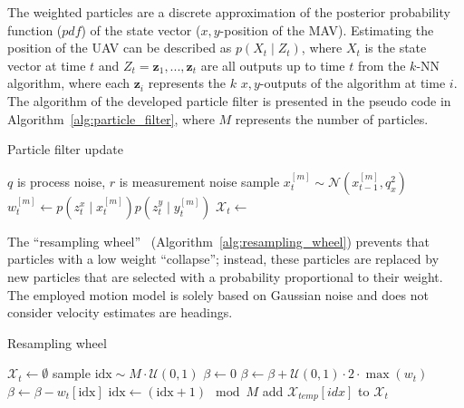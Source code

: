The weighted particles are a discrete approximation of the posterior
probability function ($pdf$) of the state vector ($x,y$-position of
the MAV). Estimating the position of the UAV can be described as
$p(X_t \mid Z_t)$, where $X_t$ is the state vector at time $t$ and
$Z_t = \mathbf{z}_1, ..., \mathbf{z}_t$ are all outputs up to time $t$
from the $k$-NN algorithm, where each $\mathbf{z}_i$ represents the
$k$ $x,y$-outputs of the algorithm at time $i$.
The algorithm of the developed particle filter is presented in the
pseudo code in Algorithm~\ref{alg:particle_filter}, where $M$
represents the number of particles.
\begin{algorithm}
\caption{Particle filter update}
\label{alg:particle_filter}
\begin{algorithmic}[1]
  \Comment $q$ is process noise, $r$ is measurement noise
       \State sample $x_t^{[m]} \sim \mathcal{N}(x_{t-1}^{[m]}, q_x^2)$
       \EndFor
  \State $w_t^{[m]} \gets p(z_t^x \mid x_t^{[m]}) p(z_t^y \mid y_t^{[m]})$
  \EndFor
  \State $\mathcal{X}_t \gets$ 
  \EndProcedure
\end{algorithmic}
\end{algorithm}
The ``resampling wheel''~\cite{thrun}
(Algorithm~\ref{alg:resampling_wheel}) prevents that particles with a
low weight ``collapse''; instead, these particles are replaced by new
particles that are selected with a probability proportional to their
weight. The employed motion model is solely based on Gaussian noise
and does not consider velocity estimates are headings.
\begin{algorithm}
\caption{Resampling wheel}
\label{alg:resampling_wheel}
  \begin{algorithmic}[1]
    \State $\mathcal{X}_t \gets \emptyset$
    \State sample $\text{idx} \sim M\cdot\mathcal{U}(0, 1)$
    \State $\beta \gets 0$
    \State $\beta \gets \beta + \mathcal{U}(0, 1)\cdot 2\cdot \max(w_t)$
    \State $\beta \gets \beta - w_t[\text{idx}]$
    \State $\text{idx} \gets (\text{idx} + 1) \mod M$
    \EndWhile
    \State add $\mathcal{X}_{temp}[idx]$ to $\mathcal{X}_t$
    \EndFor
\EndProcedure
\end{algorithmic}
\end{algorithm}

